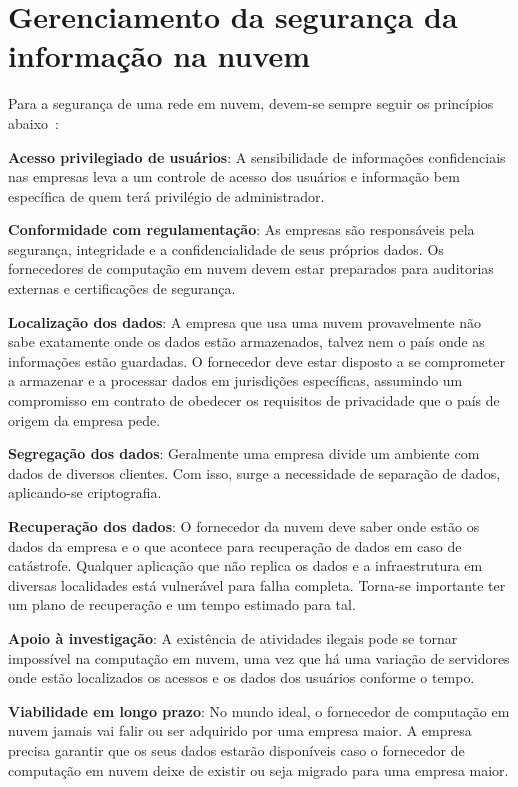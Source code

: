 \section{Gerenciamento da segurança da informação na nuvem}

Para a segurança de uma rede em nuvem, devem-se sempre seguir os princípios 
abaixo~\cite{gartner-what-to-evaluate}:


\newcommand{\itemm}[1]{\item\textbf{#1}}

\begin{itemise}

    \itemm{Acesso privilegiado de usuários}: A sensibilidade de informações
    confidenciais nas empresas leva a um controle de acesso dos usuários e
    informação bem específica de quem terá privilégio de administrador.
    
    \itemm{Conformidade com regulamentação}: As empresas são responsáveis pela
    segurança, integridade e a confidencialidade de seus próprios dados. Os
    fornecedores de computação em nuvem devem estar preparados para auditorias
    externas e certificações de segurança.
    
    \itemm{Localização dos dados}: A empresa que usa uma nuvem provavelmente não
    sabe exatamente onde os dados estão armazenados, talvez nem o país onde as
    informações estão guardadas. O fornecedor deve estar disposto a se comprometer a
    armazenar e a processar dados em jurisdições específicas, assumindo um
    compromisso em contrato de obedecer os requisitos de privacidade que o país de
    origem da empresa pede.
    
    \itemm{Segregação dos dados}: Geralmente uma empresa divide um ambiente com
    dados de diversos clientes. Com isso, surge a necessidade de separação de dados,
    aplicando-se criptografia.
    
    \itemm{Recuperação dos dados}: O fornecedor da nuvem deve saber onde estão os
    dados da empresa e o que acontece para recuperação de dados em caso de
    catástrofe. Qualquer aplicação que não replica os dados e a infraestrutura em 
    diversas localidades está vulnerável para falha completa. Torna-se importante
    ter um plano de recuperação e um tempo estimado para tal.
    
    \itemm{Apoio à investigação}: A existência de atividades ilegais pode se tornar 
    impossível na computação em nuvem, uma vez que há uma variação de servidores 
    onde estão localizados os acessos e os dados dos usuários conforme o tempo.
    
    \itemm{Viabilidade em longo prazo}: No mundo ideal, o fornecedor de computação
    em nuvem jamais vai falir ou ser adquirido por uma empresa maior. A empresa
    precisa garantir que os seus dados estarão disponíveis caso o fornecedor de
    computação em nuvem deixe de existir ou seja migrado para uma empresa maior.
\end{itemise}
\undef\itemm

